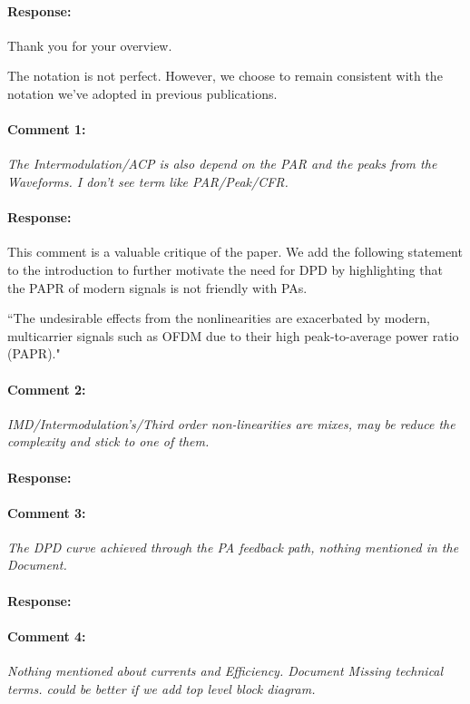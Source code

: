 \documentclass[]{article}
\begin{document}
\paragraph{Response:}
Thank you for your overview.

The notation is not perfect. However, we choose to remain consistent with the notation we've adopted in previous publications. 


\paragraph{Comment 1:}\textit{The Intermodulation/ACP is also depend on the PAR and the peaks from the Waveforms. I don't see term like PAR/Peak/CFR.}

\paragraph{Response:}
This comment is a valuable critique of the paper. We add the following statement to the introduction to further motivate the need for DPD by highlighting that the PAPR of modern signals is not friendly with PAs. 
 
{\color{red}``The undesirable effects from the nonlinearities are exacerbated by modern, multicarrier signals such as OFDM due to their high peak-to-average power ratio (PAPR)."}

\paragraph{Comment 2:}\textit{IMD/Intermodulation's/Third order non-linearities are mixes, may be reduce the complexity and stick to one of them.}
\paragraph{Response:}
	
\paragraph{Comment 3:}\textit{The DPD curve achieved through the PA feedback path, nothing mentioned in the Document.}
\paragraph{Response:}
	
\paragraph{Comment 4:}\textit{Nothing mentioned about currents and Efficiency. Document Missing technical terms. could be better if we add top level block diagram.
}
\end{document}
